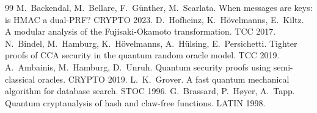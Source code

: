 \documentclass[11pt,a4paper]{article}
\theoremstyle{definition}
\theoremstyle{remark}
\begin{document}
\begin{thebibliography}{99}
 M.~Backendal, M.~Bellare, F.~G\"unther, M.~Scarlata. When messages are keys: is HMAC a dual-PRF? CRYPTO 2023.
 D.~Hofheinz, K.~H\"ovelmanns, E.~Kiltz. A modular analysis of the Fujisaki-Okamoto transformation. TCC 2017.
 N.~Bindel, M.~Hamburg, K.~H\"ovelmanns, A.~H\"ulsing, E.~Persichetti. Tighter proofs of CCA security in the quantum random oracle model. TCC 2019.
 A.~Ambainis, M.~Hamburg, D.~Unruh. Quantum security proofs using semi-classical oracles. CRYPTO 2019.
 L.~K.~Grover. A fast quantum mechanical algorithm for database search. STOC 1996.
 G.~Brassard, P.~H{\o}yer, A.~Tapp. Quantum cryptanalysis of hash and claw-free functions. LATIN 1998.
\end{thebibliography}
\end{document}
